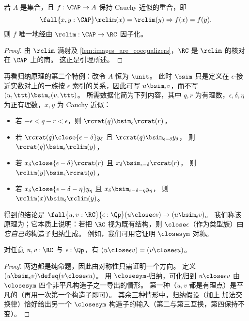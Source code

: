 %

\begin{lem} \label{RC-lim-factor}
  若 $A$ 是集合，且 $f : \CAP \to A$ 保持 Cauchy 近似的重合，即
  \begin{equation*}
    \fall{x, y : \CAP} \rclim(x) = \rclim(y) \Rightarrow f(x) = f(y),
  \end{equation*}
  则 $f$ 唯一地经由 $\rclim : \CAP \to \RC$ 因子化。
\end{lem}
\begin{proof}
  由 $\rclim$ 满射及 \cref{lem:images_are_coequalizers}，$\RC$ 是 $\rclim$ 的核对在 $\CAP$ 上的商。
  这正是引理所述。
\end{proof}

再看归纳原理的第二个特例：改令 $A$ 恒为 $\unit$。
此时 $\bsim$ 只是定义在 $\epsilon$-接近实数对上的一族按 $\epsilon$ 索引的关系，因此可写 $u\bsim_\epsilon v$，而不写 $(u,\ttt)\bsim_\epsilon (v,\ttt)$。
所需数据化简为下列内容，其中 $q, r$ 为有理数，$\epsilon, \delta, \eta$ 为正有理数，$x, y$ 为 Cauchy 近似：
\begin{itemize}
\item 若 $-\epsilon < q - r < \epsilon$，则
  $\rcrat(q) \bsim_\epsilon \rcrat(r)$，
\item 若 $\rcrat(q) \close{\epsilon - \delta} y_\delta$ 且
  $\rcrat(q)\bsim_{\epsilon-\delta} y_\delta$，
  则 $\rcrat(q) \bsim_\epsilon \rclim(y)$，
\item 若 $x_\delta \close{\epsilon - \delta} \rcrat(r)$ 且
  $x_\delta \bsim_{\epsilon-\delta} \rcrat(r)$，
  则 $\rclim(y) \bsim_\epsilon \rcrat(q)$，
\item 若 $x_\delta \close{\epsilon - \delta - \eta} y_\eta$ 且
  $x_\delta\bsim_{\epsilon - \delta - \eta} y_\eta$，
  则 $\rclim(x) \bsim_\epsilon \rclim(y)$。
\end{itemize}
得到的结论是 $\fall{u,v:\RC}{\epsilon:\Qp} (u\close\epsilon v) \to (u \bsim_\epsilon v)$。
我们称该原理为；它本质上说明：若把 $\RC$ 视为既有结构，则 $\close\epsilon$（作为类型族）由\emph{它自己的}构造子归纳生成。
例如，我们可用它证明 $\closesym$ 对称。

\begin{lem}\label{thm:RCsim-symmetric}
  对任意 $u,v:\RC$ 与 $\epsilon:\Qp$，有 $(u\close\epsilon v) = (v\close\epsilon u)$。
\end{lem}
\begin{proof}
  两边都是纯命题，因此由对称性只需证明一个方向。
  定义 $(u\bsim_\epsilon v) \defeq (v\close\epsilon u)$。
  用 $\closesym$-归纳，可化归到 $u\close\epsilon v$ 由 $\closesym$ 四个非平凡构造子之一导出的情形。
  第一种（$u,v$ 都是有理点）是平凡的（再用一次第一个构造子即可）。
  其余三种情形中，归纳假设（加上 \Q 加法交换律）恰好给出另一个 $\closesym$ 构造子的输入（第二与第三互换，第四保持不变）。
\end{proof}

